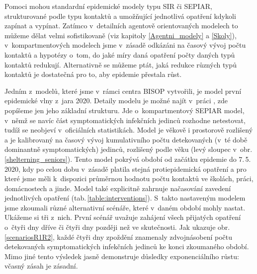 Pomoci mohou standardní epidemické modely typu SIR či SEPIAR, strukturované podle typu kontaktů a umožňující jednotlivá opatření kdykoli zapínat a vypínat. Zatímco v~detailních agentově orientovaných modelech to můžeme dělat velmi sofistikovaně (viz kapitoly \ref{Agentni_modely} a \ref{Skoly}), v~kompartmentových modelech jsme v~zásadě odkázáni na časový vývoj počtu kontaktů a hypotézy o~tom, do jaké míry daná opatření počty daných typů kontaktů redukují. Alternativně se můžeme ptát, jaká redukce různých typů kontaktů je dostatečná pro to, aby epidemie přestala růst.   

Jedním z~modelů, které jsme v~rámci centra BISOP vytvořili, je model první epidemické vlny z~jara 2020. Detaily modelu je možné najít v~práci \cite{Berec_modelB}, zde popíšeme jen jeho základní strukturu. Jde o~kompartmentový SEPIAR model, v~němž se navíc část symptomatických infekčních jedinců rozhodne netestovat, tudíž se neobjeví v~oficiálních statistikách. Model je věkově i prostorově rozlišený a je kalibrovaný na časový vývoj kumulativního počtu detekovaných (v~té době dominantně symptomatických) jedinců, rozlišený podle věku (levý sloupec v~obr.\,\ref{shelterning_seniors}). Tento model pokrývá období od začátku epidemie do 7.\,5.\,2020, kdy po celou dobu v~zásadě platila stejná protiepidemická opatření a pro které jsme měli k~dispozici průměrnou hodnotu počtu kontaktů ve školách, práci, domácnostech a jinde. Model také explicitně zahrnuje načasování zavedení jednotlivých opatření (tab.\,\ref{table:interventions}). S~takto nastaveným modelem jsme zkoumali různé alternativní scénáře, které v~daném období mohly nastat. Ukážeme si tři z~nich. První scénář uvažuje zahájení všech přijatých opatření o~čtyři dny dříve či čtyři dny později než ve skutečnosti. Jak ukazuje obr.\,\ref{scenariosR1R2}, každé čtyři dny zpoždění znamenaly zdvojnásobení počtu detekovaných symptomatických infekčních jedinců ke konci zkoumaného období. Mimo jiné tento výsledek jasně demonstruje důsledky exponenciálního růstu: včasný zásah je zásadní. 


